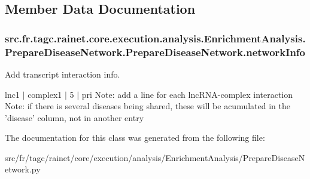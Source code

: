 \subsection{Member Data Documentation}
\hypertarget{classsrc_1_1fr_1_1tagc_1_1rainet_1_1core_1_1execution_1_1analysis_1_1EnrichmentAnalysis_1_1Prepadc28f54f950771e5293b3cf9082b7c77_a95590609d0ba5814a33ceec5a91ba37e}{
\subsubsection[{network\-Info}]{\setlength{\rightskip}{0pt plus 5cm}src.\-fr.\-tagc.\-rainet.\-core.\-execution.\-analysis.\-Enrichment\-Analysis.\-Prepare\-Disease\-Network.\-Prepare\-Disease\-Network.\-network\-Info}}\label{classsrc_1_1fr_1_1tagc_1_1rainet_1_1core_1_1execution_1_1analysis_1_1EnrichmentAnalysis_1_1Prepadc28f54f950771e5293b3cf9082b7c77_a95590609d0ba5814a33ceec5a91ba37e}


Add transcript interaction info. 

lnc1 $\vert$ complex1 $\vert$ 5 $\vert$ pri Note\-: add a line for each lnc\-R\-N\-A-\/complex interaction Note\-: if there is several diseases being shared, these will be acumulated in the 'disease' column, not in another entry 

The documentation for this class was generated from the following file\-:\begin{DoxyCompactItemize}
\item 
src/fr/tagc/rainet/core/execution/analysis/\-Enrichment\-Analysis/Prepare\-Disease\-Network.\-py\end{DoxyCompactItemize}
